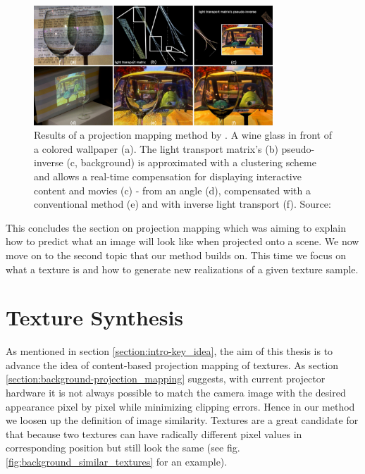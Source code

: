 \begin{figure}[ht]
    \centering
    \includegraphics[width=0.8\textwidth]{images/02-wetzstein_result_compressed.jpg}
    \caption{Results of a projection mapping method by \citet{Wetzstein2007}. A wine glass in front of a colored wallpaper (a). The light transport matrix’s (b) pseudo-inverse (c, background) is approximated with a clustering scheme and allows a real-time compensation for displaying interactive content and movies (c) - from an angle (d), compensated with a conventional method (e) and with inverse light transport (f). Source: \citet{Wetzstein2007}}
    \label{fig:background_wetzstein_result}
\end{figure}

This concludes the section on projection mapping which was aiming to explain how to predict what an image will look like when projected onto a scene. We now move on to the second topic that our method builds on. This time we focus on what a texture is and how to generate new realizations of a given texture sample.

\section{Texture Synthesis}
\label{section:background-texture_synthesis}

As mentioned in section \ref{section:intro-key_idea}, the aim of this thesis is to advance the idea of content-based projection mapping of textures. As section \ref{section:background-projection_mapping} suggests, with current projector hardware it is not always possible to match the camera image with the desired appearance pixel by pixel while minimizing clipping errors. Hence in our method we loosen up the definition of image similarity. Textures are a great candidate for that because two textures can have radically different pixel values in corresponding position but still look the same (see fig. \ref{fig:background_similar_textures} for an example).


